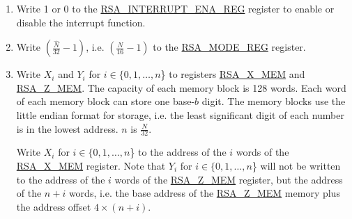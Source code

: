 \documentclass[main\_\_EN.tex]{subfiles}
\begin{document}
\begin{enumerate}

    \item Write 1 or 0 to the \hyperref[regdesc:RSAINTERRUPTENAREG]{RSA\_INTERRUPT\_ENA\_REG} register to enable or disable the interrupt function.

    \item Write \begin{math}( \frac{\hat{N}}{32} - 1 )\end{math}, i.e. \begin{math}( \frac{N}{16} - 1 )\end{math} to the \hyperref[regdesc:RSAMODEREG]{RSA\_MODE\_REG} register.

    \item Write \begin{math}{X}_{i}\end{math} and \begin{math}{Y}_{i}\end{math} for \begin{math}i \in \{ 0, 1, \dots, n \end{math}\} to registers \hyperref[regdesc:RSAmemory]{RSA\_X\_MEM} and \hyperref[regdesc:RSAmemory]{RSA\_Z\_MEM}. The capacity of each memory block is 128 words. Each word of each memory block can store one base-\begin{math}b\end{math} digit. The memory blocks use the little endian format for storage, i.e. the least significant digit of each number is in the lowest address. \begin{math}n\end{math} is \begin{math} \frac{N}{32} \end{math}.

         Write \begin{math}{X}_{i}\end{math} for \begin{math}i \in \{ 0, 1, \dots, n \end{math}\} to the address of the \begin{math}i\end{math} words of the \hyperref[regdesc:RSAmemory]{RSA\_X\_MEM} register. Note that \begin{math}{Y}_{i}\end{math} for \begin{math}i \in \{ 0, 1, \dots, n \end{math}\} will not be written to the address of the \begin{math}i\end{math} words of the \hyperref[regdesc:RSAmemory]{RSA\_Z\_MEM} register, but the address of the \begin{math}n+i\end{math} words, i.e. the base address of the \hyperref[regdesc:RSAmemory]{RSA\_Z\_MEM} memory plus the address offset \begin{math}4 \times (n+i) \end{math}.


\end{enumerate}
\end{document}
